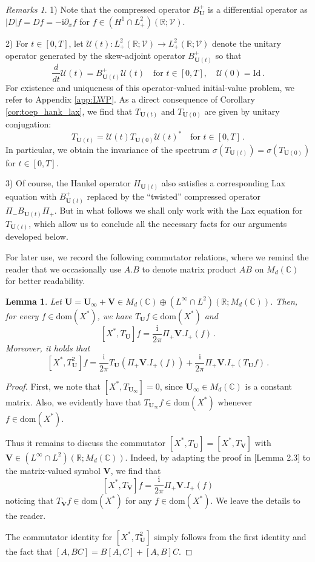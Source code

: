 \documentclass[11pt,reqno]{amsart}
\newtheorem{lem}{Lemma}[section]
\theoremstyle{definition}
\theoremstyle{remark}
\theoremstyle{remark}
\newtheorem*{remarks*}{Remarks}
\numberwithin{equation}{section}
\newcommand{\C}{\mathbb{C}}
\newcommand{\R}{\mathbb{R}}
\newcommand{\UU}{\mathcal{U}}
\newcommand{\VV}{\mathcal{V}}
\newcommand{\dom}{\mathrm{dom}}
\newcommand{\pt}{\partial}
\newcommand{\ii}{\mathrm{i}}
\newcommand{\Vb}{\mathbf{V}}
\newcommand{\Ub}{\mathbf{U}}
\newcommand{\id}{\mathrm{Id}}
\begin{document}
\begin{remarks*}
1) Note that the compressed operator $B^+_\Ub$ is a differential operator as $|D| f = Df  = -\ii \pt_x f$ for $f \in (H^1 \cap L^2_+)(\R; \VV)$. 

2) For $t \in [0,T]$, let $\UU(t) : L^2_+(\R; \VV) \to L^2_+(\R; \VV)$ denote the unitary operator generated by the skew-adjoint operator $B^+_{\Ub(t)}$ so that
\begin{equation} \label{eq:ode_B}
\frac{d}{dt} \UU(t) = B^+_{\Ub(t)} \UU(t) \quad \mbox{for $t \in [0,T]$}, \quad \UU(0) = \id \, .
\end{equation}
For existence and uniqueness of this operator-valued initial-value problem, we refer to Appendix \ref{app:LWP}. As a direct consequence of Corollary \ref{cor:toep_hank_lax}, we find that $T_{\Ub(t)}$ and $T_{\Ub(0)}$ are given by unitary conjugation:
$$
T_{\Ub(t)} = \UU(t) T_{\Ub(0)} \UU(t)^* \quad \mbox{for $t \in [0,T]$} \, .
$$
In particular, we obtain the invariance of the spectrum $\sigma(T_{\Ub(t)}) = \sigma(T_{\Ub(0)})$ for $t \in [0,T]$.

3) Of course, the Hankel operator $H_{\Ub(t)}$ also satisfies a corresponding Lax equation with $B_{\Ub(t)}^+$ replaced by the ``twisted'' compressed operator $\Pi_- B_{\Ub(t)} \Pi_+$. But in what follows we shall only work with the Lax equation for $T_{\Ub(t)}$, which allow us to conclude all the necessary facts for our arguments developed below.
\end{remarks*}



For later use, we record the following commutator relations, where we remind the reader that we occasionally use $A.B$ to denote matrix product $AB$ on $M_d(\C)$ for better readability. 

\begin{lem} \label{lem:commutator}
Let $\Ub = \Ub_\infty + \Vb \in M_d(\C) \oplus (L^\infty \cap L^2)(\R; M_d(\C))$. Then, for every $f \in \dom(X^*)$, we have $T_{\Ub} f \in \dom(X^*)$ and
$$
[X^*, T_{\Ub}] f = \frac{\ii}{2 \pi} \Pi_+ \Vb.I_+(f) \, . 
$$ 
Moreover, it holds that
$$
[X^*, T_{\Ub}^2] f = \frac{\ii}{2 \pi} T_{\Ub}( \Pi_+ \Vb.I_+(f)) + \frac{\ii}{2 \pi} \Pi_+ \Vb.I_+(T_{\Ub} f) \, . 
$$
\end{lem}

\begin{proof}
First, we note that $[X^*, T_{\Ub_\infty}] = 0$, since $\Ub_\infty \in M_d(\C)$ is a constant matrix. Also, we evidently have that $T_{\Ub_\infty} f \in \dom(X^*)$ whenever $f \in \dom(X^*)$.

Thus it remains to discuss the commutator $[X^*, T_{\Ub}] = [X^*, T_{\Vb}]$ with $\Vb \in (L^\infty \cap L^2)(\R; M_d(\C))$. Indeed, by adapting the proof in \cite{GePu-24}[Lemma 2.3] to the matrix-valued symbol $\Vb$, we find that
$$
[X^*,T_{\Vb}] f = \frac{\ii}{2 \pi} \Pi_+ \Vb.I_+(f)
$$
noticing that $T_{\Vb} f \in \dom(X^*)$ for any $f \in \dom(X^*)$.  We leave the details to the reader.

The  commutator identity  for $[X^*, T_{\Ub}^2]$ simply follows from the first identity and the fact that $[A,BC] = B[A,C] + [A,B]C$.
\end{proof}
\end{document}
